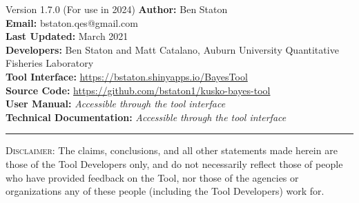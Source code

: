 \begin{bclogo}[margeG=-1.5,margeD=-1.5,logo=\hspace{17pt},couleurBarre=black, noborder=false,couleur=light-grey]{Version 1.7.0 (For use in 2024)}
   \textbf{Author:} Ben Staton \\[3pt]
   \textbf{Email:} bstaton.qes@gmail.com \\[3pt]
   \textbf{Last Updated:} March 2021 \\[3pt]
   \textbf{Developers:} Ben Staton and Matt Catalano, Auburn University Quantitative Fisheries Laboratory \\[3pt]
   \textbf{Tool Interface:} \url{https://bstaton.shinyapps.io/BayesTool} \\[3pt]
   \textbf{Source Code:} \url{https://github.com/bstaton1/kusko-bayes-tool} \\[3pt]
   \textbf{User Manual:} \textit{Accessible through the tool interface} \\[3pt]
   \textbf{Technical Documentation:} \textit{Accessible through the tool interface}
  \hrule
  \footnotesize{\textsc{Disclaimer}: The claims, conclusions, and all other statements made herein are those of the Tool Developers only, and do not necessarily reflect those of people who have provided feedback on the Tool, nor those of the agencies or organizations any of these people (including the Tool Developers) work for}.
\end{bclogo}
